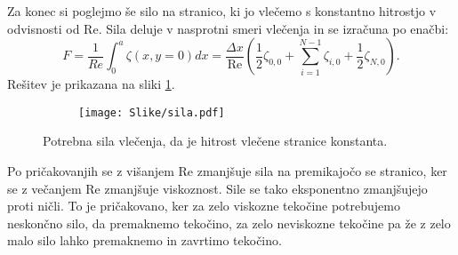 \documentclass[12pt,a4paper]{article}
\begin{document}
Za konec si poglejmo še silo na stranico, ki jo vlečemo s konstantno hitrostjo v odvisnosti od Re. Sila deluje v nasprotni smeri vlečenja in se izračuna po enačbi:
\begin{equation}
F=\frac{1}{Re} \int_0 ^{a} \zeta(x,y=0)dx = \frac{\Delta x}{\textrm{Re}}\left(  \frac{1}{2} \zeta_{0,0} + \sum _{i=1} ^{N-1} \zeta_{i,0} + \frac{1}{2}\zeta_{N,0}  \right).
\end{equation}
Rešitev je prikazana na sliki \ref{fig:slika14}.

\begin{figure}[H]
    \centering
    \begin{subfigure}[b]{0.7\textwidth}  			
        \texttt{[image: Slike/sila.pdf]}
    \end{subfigure}
    \caption{Potrebna sila vlečenja, da je hitrost vlečene stranice konstanta. } \label{fig:slika14}
\end{figure}

\noindent Po pričakovanjih se z višanjem Re zmanjšuje sila na premikajočo se stranico, ker se z večanjem Re zmanjšuje viskoznost. Sile se tako eksponentno zmanjšujejo proti ničli. To je pričakovano, ker za zelo viskozne tekočine potrebujemo neskončno silo, da premaknemo tekočino, za zelo neviskozne tekočine pa že z zelo malo silo lahko premaknemo in zavrtimo tekočino.
\end{document}
